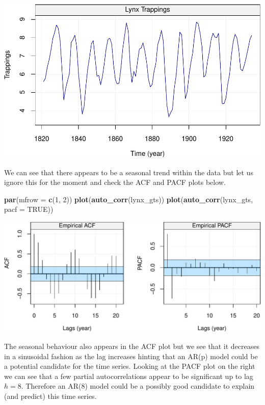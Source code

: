 \documentclass[]{book}
\newenvironment{Shaded}{\begin{snugshade}}{\end{snugshade}}
\newcommand{\DataTypeTok}[1]{\textcolor[rgb]{0.13,0.29,0.53}{#1}}
\newcommand{\DecValTok}[1]{\textcolor[rgb]{0.00,0.00,0.81}{#1}}
\newcommand{\KeywordTok}[1]{\textcolor[rgb]{0.13,0.29,0.53}{\textbf{#1}}}
\newcommand{\NormalTok}[1]{#1}
\newcommand{\OtherTok}[1]{\textcolor[rgb]{0.56,0.35,0.01}{#1}}
\theoremstyle{definition}
\theoremstyle{definition}
\theoremstyle{definition}
\theoremstyle{remark}
\begin{document}
\includegraphics{ts_files/figure-latex/unnamed-chunk-46-1.pdf}

We can see that there appears to be a seasonal trend within the data but
let us ignore this for the moment and check the ACF and PACF plots
below.

\begin{Shaded}
\begin{Highlighting}[]
\KeywordTok{par}\NormalTok{(}\DataTypeTok{mfrow =} \KeywordTok{c}\NormalTok{(}\DecValTok{1}\NormalTok{, }\DecValTok{2}\NormalTok{))}
\KeywordTok{plot}\NormalTok{(}\KeywordTok{auto_corr}\NormalTok{(lynx_gts))}
\KeywordTok{plot}\NormalTok{(}\KeywordTok{auto_corr}\NormalTok{(lynx_gts, }\DataTypeTok{pacf =} \OtherTok{TRUE}\NormalTok{))}
\end{Highlighting}
\end{Shaded}

\includegraphics{ts_files/figure-latex/unnamed-chunk-47-1.pdf}

The seasonal behaviour also appears in the ACF plot but we see that it
decreases in a sinusoidal fashion as the lag increases hinting that an
AR(p) model could be a potential candidate for the time series. Looking
at the PACF plot on the right we can see that a few partial
autocorrelations appear to be significant up to lag \(h=8\). Therefore
an AR(8) model could be a possibly good candidate to explain (and
predict) this time series.
\end{document}
